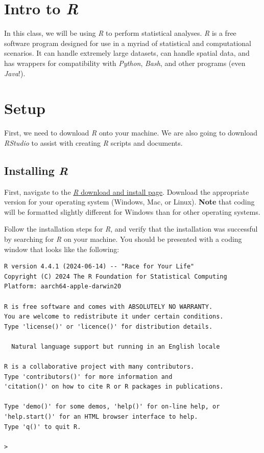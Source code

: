 \documentclass[
  letterpaper,
  DIV=11,
  numbers=noendperiod]{scrreprt}
\begin{document}
\chapter{\texorpdfstring{Intro to
\emph{R}}{Intro to R}}\label{intro-to-r}

In this class, we will be using \emph{R} to perform statistical
analyses. \emph{R} is a free software program designed for use in a
myriad of statistical and computational scenarios. It can handle
extremely large datasets, can handle spatial data, and has wrappers for
compatibility with \emph{Python}, \emph{Bash}, and other programs (even
\emph{Java}!).


\chapter{Setup}\label{setup}

First, we need to download \emph{R} onto your machine. We are also going
to download \emph{RStudio} to assist with creating \emph{R} scripts and
documents.

\section{\texorpdfstring{Installing
\emph{R}}{Installing R}}\label{installing-r}

First, navigate to the \href{https://cloud.r-project.org/}{\emph{R}
download and install page}. Download the appropriate version for your
operating system (Windows, Mac, or Linux). \textbf{Note} that coding
will be formatted slightly different for Windows than for other
operating systems.

Follow the installation steps for \emph{R}, and verify that the
installation was successful by searching for \emph{R} on your machine.
You should be presented with a coding window that looks like the
following:

\begin{verbatim}
R version 4.4.1 (2024-06-14) -- "Race for Your Life"
Copyright (C) 2024 The R Foundation for Statistical Computing
Platform: aarch64-apple-darwin20

R is free software and comes with ABSOLUTELY NO WARRANTY.
You are welcome to redistribute it under certain conditions.
Type 'license()' or 'licence()' for distribution details.

  Natural language support but running in an English locale

R is a collaborative project with many contributors.
Type 'contributors()' for more information and
'citation()' on how to cite R or R packages in publications.

Type 'demo()' for some demos, 'help()' for on-line help, or
'help.start()' for an HTML browser interface to help.
Type 'q()' to quit R.

>
\end{verbatim}
\end{document}
